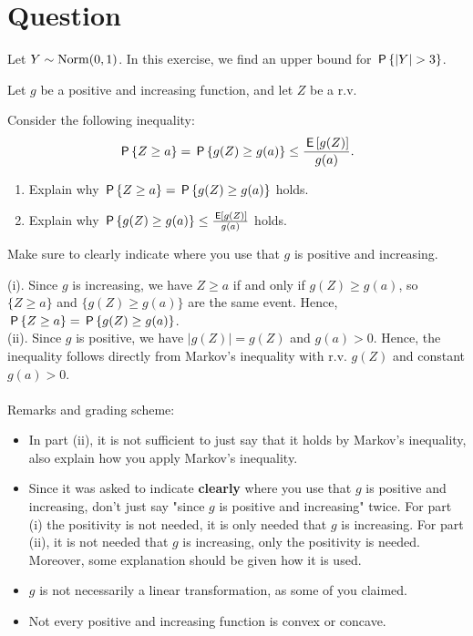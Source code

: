 \section*{Question}

Let $Y \sim \Norm{0,1}$. 
In this exercise, we find an upper bound for $\P{|Y| > 3}$.

\begin{exercise}[1.5]
 Let $g$ be a positive and increasing function, and let $Z$ be a r.v. 

Consider the following inequality:
$$\P{Z \geq a} = \P{g(Z) \geq g(a)}   \leq \frac{\E{g(Z)}}{g(a)}.$$
\begin{enumerate}
\item[(i)] Explain why $\P{Z \geq a} = \P{g(Z) \geq g(a)}$ holds. 
\item[(ii)] Explain why $\P{g(Z) \geq g(a)}   \leq \frac{\E{g(Z)}}{g(a)}$ holds. 
\end{enumerate}
Make sure to clearly indicate where you use that  $g$ is positive and increasing. \\
\begin{solution}
(i). Since $g$ is increasing, we have $Z \geq a$ if and only if $g(Z) \geq g(a)$, so $\{Z \geq a\}$ and $\{g(Z) \geq g(a)\}$ are the same event. Hence,  $\P{Z \geq a} = \P{g(Z) \geq g(a)}$.  \\
(ii). Since $g$ is positive, we have $|g(Z)| = g(Z)$ and $g(a) > 0$. Hence, the inequality follows directly from Markov's inequality with r.v. $g(Z)$ and constant $g(a) > 0$. \\ \\
\noindent Remarks and grading scheme:
\begin{itemize}
\item In part (ii), it is not sufficient to just say that it holds by Markov's inequality, also explain how you apply Markov's inequality. 
\item Since it was asked to indicate \textbf{clearly} where you use that  $g$ is positive and increasing, don't just say "since $g$ is positive and increasing" twice. For part (i) the positivity is not needed, it is only needed that $g$ is increasing. For part (ii), it is not needed that $g$ is increasing, only the positivity is needed. Moreover, some explanation should be given how it is used. 
\item $g$ is not necessarily a linear transformation, as some of you claimed.
\item Not every positive and increasing function is convex or concave. \\ 

\end{itemize}
\end{solution}
\end{exercise}
